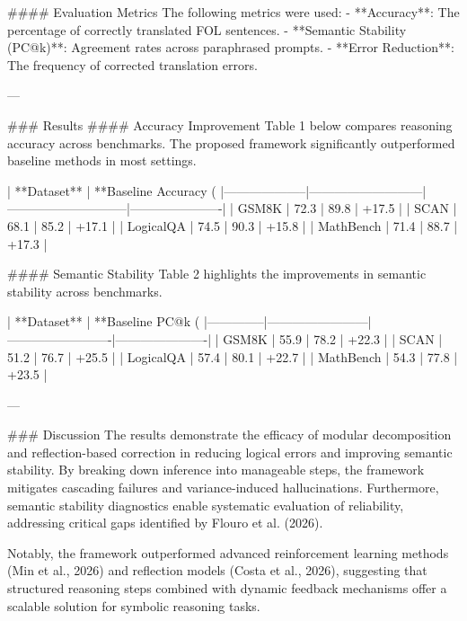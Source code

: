 #### Evaluation Metrics  
The following metrics were used:  
- **Accuracy**: The percentage of correctly translated FOL sentences.  
- **Semantic Stability (PC@k)**: Agreement rates across paraphrased prompts.  
- **Error Reduction**: The frequency of corrected translation errors.  

---

### Results  
#### Accuracy Improvement  
Table 1 below compares reasoning accuracy across benchmarks. The proposed framework significantly outperformed baseline methods in most settings.

| **Dataset**       | **Baseline Accuracy (%
|--------------------|---------------------------|-----------------------------|----------------------|  
| GSM8K             | 72.3                      | 89.8                        | +17.5               |  
| SCAN              | 68.1                      | 85.2                        | +17.1               |  
| LogicalQA         | 74.5                      | 90.3                        | +15.8               |  
| MathBench         | 71.4                      | 88.7                        | +17.3               |  

#### Semantic Stability  
Table 2 highlights the improvements in semantic stability across benchmarks.

| **Dataset**  | **Baseline PC@k (%
|--------------|------------------------|-------------------------|----------------------|  
| GSM8K       | 55.9                   | 78.2                    | +22.3               |  
| SCAN        | 51.2                   | 76.7                    | +25.5               |  
| LogicalQA   | 57.4                   | 80.1                    | +22.7               |  
| MathBench   | 54.3                   | 77.8                    | +23.5               |  

---

### Discussion  
The results demonstrate the efficacy of modular decomposition and reflection-based correction in reducing logical errors and improving semantic stability. By breaking down inference into manageable steps, the framework mitigates cascading failures and variance-induced hallucinations. Furthermore, semantic stability diagnostics enable systematic evaluation of reliability, addressing critical gaps identified by Flouro et al. (2026).

Notably, the framework outperformed advanced reinforcement learning methods (Min et al., 2026) and reflection models (Costa et al., 2026), suggesting that structured reasoning steps combined with dynamic feedback mechanisms offer a scalable solution for symbolic reasoning tasks.

